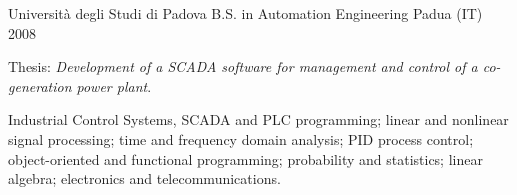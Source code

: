 \begin{cventries}
	\cventry%
		{Università degli Studi di Padova}
		{B.S. in Automation Engineering}
		{Padua (IT)}
		{2008}
		{\begin{cvitems}
			\item {Thesis: \emph{Development of a SCADA software for management and control of a co-generation power plant}.}
			\item {%
				Industrial Control Systems, SCADA and PLC programming;
				linear and nonlinear signal processing;
				time and frequency domain analysis;
				PID process control;
				object-oriented and functional programming;
				probability and statistics;
				linear algebra;
				electronics and telecommunications.
				}
		\end{cvitems}}

\end{cventries}
